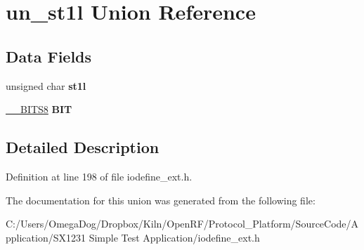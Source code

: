 \hypertarget{unionun__st1l}{\section{un\-\_\-st1l Union Reference}
\label{unionun__st1l}
}
\subsection*{Data Fields}
\begin{DoxyCompactItemize}
\item 
\hypertarget{unionun__st1l_a3f189e1d21d79cfe1a9a69bca8a20321}{unsigned char {\bfseries st1l}}\label{unionun__st1l_a3f189e1d21d79cfe1a9a69bca8a20321}

\item 
\hypertarget{unionun__st1l_aaa34719c88be16faae54a23bf1ad3f1b}{\hyperlink{struct_____b_i_t_s8}{\-\_\-\-\_\-\-B\-I\-T\-S8} {\bfseries B\-I\-T}}\label{unionun__st1l_aaa34719c88be16faae54a23bf1ad3f1b}

\end{DoxyCompactItemize}


\subsection{Detailed Description}


Definition at line 198 of file iodefine\-\_\-ext.\-h.



The documentation for this union was generated from the following file\-:\begin{DoxyCompactItemize}
\item 
C\-:/\-Users/\-Omega\-Dog/\-Dropbox/\-Kiln/\-Open\-R\-F/\-Protocol\-\_\-\-Platform/\-Source\-Code/\-Application/\-S\-X1231 Simple Test Application/iodefine\-\_\-ext.\-h\end{DoxyCompactItemize}
